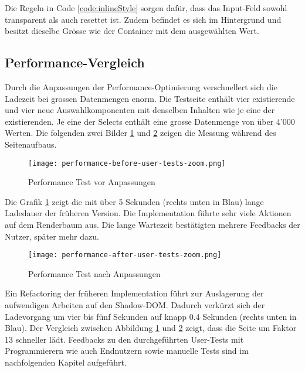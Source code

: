Die Regeln in Code \ref{code:inlineStyle} sorgen dafür, dass das Input-Feld sowohl transparent als auch resettet ist. 
Zudem befindet es sich im Hintergrund und besitzt dieselbe Grösse wie der Container mit dem ausgewählten Wert. 


\subsection{Performance-Vergleich}
\label{sec:performanceCompare}

Durch die Anpassungen der Performance-Optimierung verschnellert sich die Ladezeit bei grossen Datenmengen enorm. 
Die Testseite enthält vier existierende und vier neue Auswahlkomponenten mit denselben Inhalten wie je eine der existierenden. 
Je eine der Selects enthält eine grosse Datenmenge von über 4'000 Werten. 
Die folgenden zwei Bilder \ref{img:performanceTestBefore} und \ref{img:performanceTestAfter} zeigen die Messung während des Seitenaufbaus. 

\begin{figure}[!htb]
    \centering
    \texttt{[image: performance-before-user-tests-zoom.png]}
    \caption{\centering Performance Test vor Anpassungen}
    \label{img:performanceTestBefore}
\end{figure}

Die Grafik \ref{img:performanceTestBefore} zeigt die mit über 5 Sekunden (rechts unten in Blau) lange Ladedauer der früheren Version. 
Die Implementation führte sehr viele Aktionen auf dem Renderbaum aus. 
Die lange Wartezeit bestätigten mehrere Feedbacks der Nutzer, später mehr dazu. 

\begin{figure}[!htb]
    \centering
    \texttt{[image: performance-after-user-tests-zoom.png]}
    \caption{\centering Performance Test nach Anpassungen}
    \label{img:performanceTestAfter}
\end{figure}

Ein Refactoring der früheren Implementation führt zur Auslagerung der aufwendigen Arbeiten auf den Shadow-DOM. 
Dadurch verkürzt sich der Ladevorgang um vier bis fünf Sekunden auf knapp 0.4 Sekunden (rechts unten in Blau). 
Der Vergleich zwischen Abbildung \ref{img:performanceTestBefore} und \ref{img:performanceTestAfter} zeigt, dass die Seite um Faktor 13 schneller lädt. 
Feedbacks zu den durchgeführten User-Tests mit Programmierern wie auch Endnutzern sowie manuelle Tests sind im nachfolgenden Kapitel aufgeführt. 



